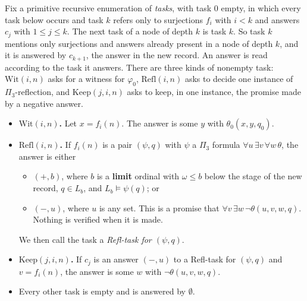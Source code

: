 \documentclass[11pt]{article}
\begin{document}
Fix a primitive recursive enumeration of \emph{tasks}, with task 0 empty, in which every task below occurs and task
$k$ refers only to surjections $f_i$ with $i < k$ and answers $c_j$ with $1 \le j \le k$. The next task of a node of
depth $k$ is task $k$. So task $k$ mentions only surjections and answers already present in a node of depth $k$,
and it is answered by $c_{k+1}$, the answer in the new record. An answer is read according to the task it
answers. There are three kinds of nonempty task: $\mathrm{Wit}(i, n)$ asks for a witness for $\varphi_0$,
$\mathrm{Refl}(i, n)$ asks to decide one instance of $\Pi_3$-reflection, and $\mathrm{Keep}(j, i, n)$ asks to keep, in
one instance, the promise made by a negative answer.

\begin{itemize}
\item \textbf{$\mathrm{Wit}(i, n)$.} Let $x = f_i(n)$. The answer is some $y$ with $\theta_0(x, y, q_0)$.
\item \textbf{$\mathrm{Refl}(i, n)$.} If $f_i(n)$ is a pair $(\psi, q)$ with $\psi$ a $\Pi_3$ formula
  $\forall u\, \exists v\, \forall w\, \theta$, the answer is either
  \begin{itemize}
  \item $(+, b)$, where $b$ is a \textbf{limit} ordinal with $\omega \le b$ below the stage of the new record,
    $q \in L_b$, and $L_b \models \psi(q)$; or
  \item $(-, u)$, where $u$ is any set. This is a promise that $\forall v\, \exists w\, \neg\theta(u, v, w, q)$.
    Nothing is verified when it is made.
  \end{itemize}
  We then call the task a \emph{Refl-task for $(\psi, q)$}.
\item \textbf{$\mathrm{Keep}(j, i, n)$.} If $c_j$ is an answer $(-, u)$ to a Refl-task for $(\psi, q)$ and
  $v = f_i(n)$, the answer is some $w$ with $\neg\theta(u, v, w, q)$.
\item Every other task is empty and is answered by $\emptyset$.
\end{itemize}
\end{document}
